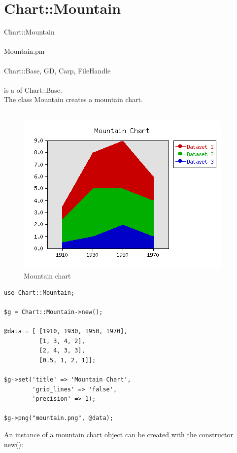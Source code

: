 \section{Chart::Mountain}
 Chart::Mountain\\ \\
 Mountain.pm\\ \\
Chart::Base, GD, Carp, FileHandle\\ \\
  is a  of Chart::Base.\\
The class Mountain creates a mountain chart.\\
\\
\begin{figure}[h]
	\begin{center}
		\includegraphics[scale =0.6]{mountain.png}
	\end{center}
	\caption{Mountain chart}
	\label{fig:mountain}
\end{figure}
\begin{verbatim}
use Chart::Mountain;

$g = Chart::Mountain->new();

@data = [ [1910, 1930, 1950, 1970],
          [1, 3, 4, 2],
          [2, 4, 3, 3],
          [0.5, 1, 2, 1]];

$g->set('title' => 'Mountain Chart',
        'grid_lines' => 'false',
        'precision' => 1);

$g->png("mountain.png", @data);

\end{verbatim}
 An instance of a mountain chart object can be created with the constructor new():\\
